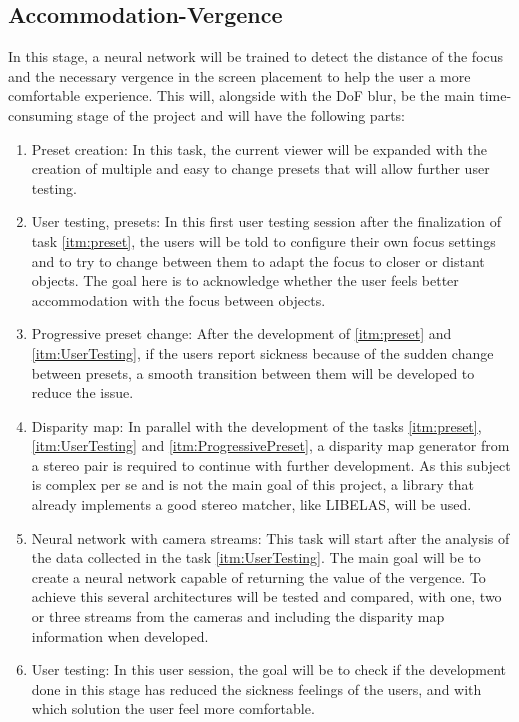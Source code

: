 \documentclass[10pt,a4paper,twocolumn,twoside]{article}
\begin{document}
	
	\subsection{Accommodation-Vergence}
	\label{subsec:vergence}
	In this stage, a neural network will be trained to detect the distance of the focus and the necessary vergence in the screen placement to help the user a more comfortable experience.
	This will, alongside with the DoF blur, be the main time-consuming stage of the project and will have the following parts:
	\begin{enumerate}
		\item \label{itm:preset}  Preset creation: In this task, the current viewer will be expanded with the creation of multiple and easy to change presets that will allow further user testing.
		
		\item \label{itm:UserTesting} User testing, presets: In this first user testing session after the finalization of task \ref{itm:preset}, the users will be told to configure their own focus settings and to try to change between them to adapt the focus to closer or distant objects. The goal here is to acknowledge whether the user feels better accommodation with the focus between objects.
		
		\item \label{itm:ProgressivePreset} Progressive preset change: After the development of \ref{itm:preset} and \ref{itm:UserTesting}, if the users report sickness because of the sudden change between presets, a smooth transition between them will be developed to reduce the issue. 
		
		\item Disparity map: In parallel with the development of the tasks \ref{itm:preset}, \ref{itm:UserTesting} and \ref{itm:ProgressivePreset}, a disparity map generator from a stereo pair is required to continue with further development. As this subject is complex per se and is not the main goal of this project, a library that already implements a good stereo matcher, like LIBELAS\cite{web:LIBELAS}, will be used. 
		
		\item Neural network with camera streams: This task will start after the analysis of the data collected in the task \ref{itm:UserTesting}. The main goal will be to create a neural network capable of returning the value of the vergence. To achieve this several architectures will be tested and compared, with one, two or three streams from the cameras and including the disparity map information when developed.
		
		\item User testing: In this user session, the goal will be to check if the development done in this stage has reduced the sickness feelings of the users, and with which solution the user feel more comfortable.
	\end{enumerate}
	
\end{document}
